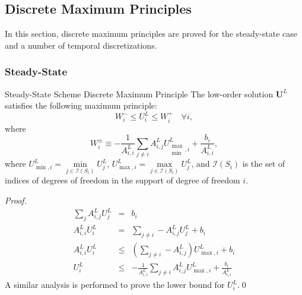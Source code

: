 \subsection{Discrete Maximum Principles}\label{DMP}
In this section, discrete maximum principles are proved for the steady-state
case and a number of temporal discretizations.
\subsubsection{Steady-State}
\begin{theorem}{Steady-State Scheme Discrete Maximum Principle}
The low-order solution $\mathbf{U}^L$ satisfies the following maximum principle:
\begin{equation}\label{ss_max_principle}
   W_i^-\leq U_i^L\leq W_i^+\quad\forall i,
\end{equation}
where
\begin{equation}
   W_i^\pm \equiv -\frac{1}{A^L_{i,i}}\sum\limits_{j\ne i} A^L_{i,j}
      U_{\substack{\max\\\min},i}^L + \frac{b_i}{A^L_{i,i}},
\end{equation}
where $U_{\min,i}^L = \min\limits_{j\in \mathcal{I}(S_i)}U_j^L$, $U_{\max,i}^L
= \max\limits_{j\in \mathcal{I}(S_i)}U_j^L$,
and $\mathcal{I}(S_i)$ is the set of indices of degrees of freedom in the support
of degree of freedom $i$.
\end{theorem}

\begin{proof}
\begin{eqnarray*}
	\sum\limits_j A^L_{i,j}U_j^L & = & b_i\\
	A^L_{i,i}U_i^L & = & \sum\limits_{j\ne i} -A^L_{i,j}U_j^L + b_i\\
	A^L_{i,i}U_i^L & \le & \left(\sum\limits_{j\ne i} -A^L_{i,j}\right)U_{\max,i}^L + b_i\\
   U_i^L & \le & -\frac{1}{A^L_{i,i}}\sum\limits_{j\ne i} A^L_{i,j}U_{\max,i}^L
      + \frac{b_i}{A^L_{i,i}}
\end{eqnarray*}
A similar analysis is performed to prove the lower bound for $U_i^L$.\qed
\end{proof}